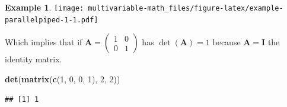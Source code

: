 \documentclass[
]{book}
\newenvironment{Shaded}{\begin{snugshade}}{\end{snugshade}}
\newcommand{\DecValTok}[1]{\textcolor[rgb]{0.00,0.00,0.81}{#1}}
\newcommand{\KeywordTok}[1]{\textcolor[rgb]{0.13,0.29,0.53}{\textbf{#1}}}
\newcommand{\NormalTok}[1]{#1}
\theoremstyle{definition}
\theoremstyle{definition}
\newtheorem{example}{Example}[chapter]
\theoremstyle{definition}
\theoremstyle{definition}
\theoremstyle{remark}
\begin{document}
\begin{example}
\texttt{[image: multivariable-math\_files/figure-latex/example-parallelpiped-1-1.pdf]}

Which implies that if \(\mathbf{A} = \begin{pmatrix} 1 & 0 \\ 0 & 1 \end{pmatrix}\) has \(\det(\mathbf{A}) = 1\) because \(\mathbf{A} = \mathbf{I}\) the identity matrix.

\begin{Shaded}
\begin{Highlighting}[]
\KeywordTok{det}\NormalTok{(}\KeywordTok{matrix}\NormalTok{(}\KeywordTok{c}\NormalTok{(}\DecValTok{1}\NormalTok{, }\DecValTok{0}\NormalTok{, }\DecValTok{0}\NormalTok{, }\DecValTok{1}\NormalTok{), }\DecValTok{2}\NormalTok{, }\DecValTok{2}\NormalTok{))}
\end{Highlighting}
\end{Shaded}

\begin{verbatim}
## [1] 1
\end{verbatim}

\end{example}
\end{document}
